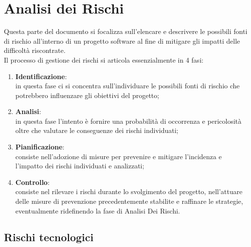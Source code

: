 \section{Analisi dei Rischi}
Questa parte del documento si focalizza sull'elencare e descrivere le possibili fonti di rischio all'interno di un progetto software al fine di mitigare gli impatti delle difficoltà riscontrate.\\
Il processo di gestione dei rischi si articola essenzialmente in 4 fasi:
\begin{enumerate}
    \item \textbf{Identificazione}:\\
    in questa fase ci si concentra sull'individuare le possibili fonti di rischio che potrebbero influenzare gli obiettivi del progetto;
    \item \textbf{Analisi}:\\
    in questa fase l'intento è fornire una probabilità di occorrenza e pericolosità oltre che valutare le conseguenze dei rischi individuati;
    \item \textbf{Pianificazione}:\\
    consiste nell'adozione di misure per prevenire e mitigare l'incidenza e l'impatto dei rischi individuati e analizzati;
    \item \textbf{Controllo}:\\
    consiste nel rilevare i rischi durante lo svolgimento del progetto, nell'attuare delle misure di prevenzione precedentemente stabilite e raffinare le strategie, eventualmente ridefinendo la fase di Analisi Dei Rischi.
\end{enumerate}

\subsection{Rischi tecnologici}
%
%
